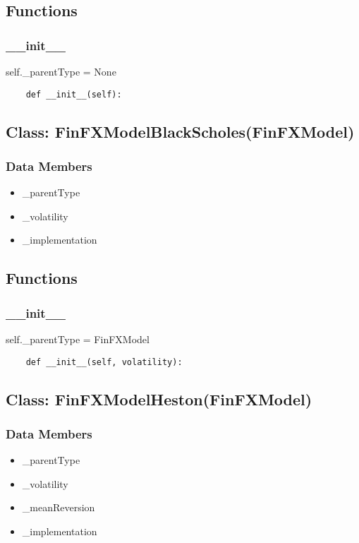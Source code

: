 \documentclass[twoside,11pt]{book}
\begin{document}
\subsection*{Functions}

\subsubsection*{{\bf \_\_init\_\_}}
self.\_parentType = None 

\begin{lstlisting}
    def __init__(self):
\end{lstlisting}

\subsection*{Class: FinFXModelBlackScholes(FinFXModel)}


\subsubsection*{Data Members}
\begin{itemize}
\item{\_parentType}
\item{\_volatility}
\item{\_implementation}
\end{itemize}

\subsection*{Functions}

\subsubsection*{{\bf \_\_init\_\_}}
self.\_parentType = FinFXModel 

\begin{lstlisting}
    def __init__(self, volatility):
\end{lstlisting}

\subsection*{Class: FinFXModelHeston(FinFXModel)}


\subsubsection*{Data Members}
\begin{itemize}
\item{\_parentType}
\item{\_volatility}
\item{\_meanReversion}
\item{\_implementation}
\end{itemize}
\end{document}
